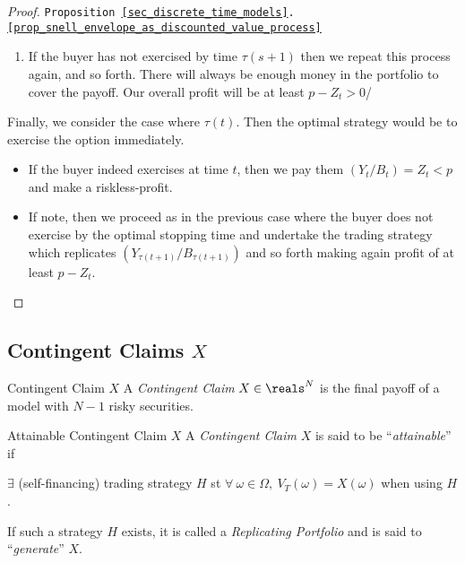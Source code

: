 \documentclass[11pt,a4paper]{article}
\begin{document}
\begin{proof}{\texttt{Proposition \ref{sec_discrete_time_models}.\ref{prop_snell_envelope_as_discounted_value_process}}}
\begin{enumerate}
\begin{itemize}
        \item We repeat the process, undertaking the trading strategy that replicates $Y_{\tau(s+1)}/B_{\tau(s+1)}$.
        \item The value of the portfolio to be built up is equal to
        \[ \expect_\Q[Y_{\tau(s+1)}/B_{\tau(s+1)}|\mathcal{F}_s]\leq\expect_\Q[Y_{\tau(s)}/B_{\tau(s)}|\mathcal{F}_s]=Z_s \]
        Therefore the change of the portfolio will only pay us some money which we put in the bank account.
        \item As before, if the option buyer exercises at some time $u\leq\tau(s+1)$ then the value of the portfolio will be enough to cover the payoff $Y_u$.
      \end{itemize}
      \item If the buyer has not exercised by time $\tau(s+1)$ then we repeat this process again, and so forth. There will always be enough money in the portfolio to cover the payoff. Our overall profit will be at least $p-Z_t>0$/
    \end{enumerate}
    Finally, we consider the case where $\tau(t)$. Then the optimal strategy would be to exercise the option immediately.
    \begin{itemize}
      \item If the buyer indeed exercises at time $t$, then we pay them $(Y_t/B_t)=Z_t<p$ and make a riskless-profit.
      \item If note, then we proceed as in the previous case where the buyer does not exercise by the optimal stopping time and undertake the trading strategy which replicates $(Y_{\tau(t+1)}/B_{\tau(t+1)})$ and so forth making again profit of at least $p-Z_t$.
    \end{itemize}
    \proved
  \end{proof}

\subsection{Contingent Claims $X$}

  \begin{definition}{Contingent Claim $X$}
    A \textit{Contingent Claim} $X\in\reals^N$ is the final payoff of a model with $N-1$ risky securities.
  \end{definition}

  \begin{definition}{Attainable Contingent Claim $X$}
    A \textit{Contingent Claim} $X$ is said to be ``\textit{attainable}'' if
    \begin{center}
      $\exists$ (self-financing) trading strategy $H$ st $\forall\ \omega\in\Omega,\ V_T(\omega)=X(\omega)$ when using $H$.
    \end{center}
    If such a strategy $H$ exists, it is called a \textit{Replicating Portfolio} and is said to ``\textit{generate}'' $X$.
  \end{definition}
\end{document}
